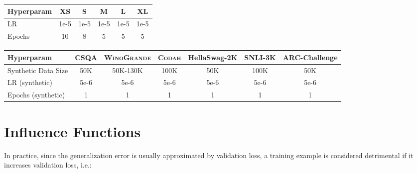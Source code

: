 \documentclass[11pt,a4paper]{article}
\newcommand{\gdaug}{}
\newcommand{\winogrande}{\textsc{WinoGrande}\xspace}
\newcommand{\codah}{\textsc{Codah}\xspace}
\newcommand{\roberta}{\textsc{RoBERTa}\xspace}
\begin{document}
\begin{table*}[t]
\begin{center}
\footnotesize
\begin{tabular}{lccccc}
\toprule
\bf Hyperparam  & \bf XS  & \bf S &\bf M &\bf L &\bf XL \\
\midrule 

LR &1e-5  &1e-5 &1e-5  &1e-5 &1e-5\\
Epochs & 10 & 8 &5 &5 &5\\


\bottomrule
\end{tabular}
\end{center}
\caption{
Hyperparameter settings for finetuning \roberta on \winogrande.
}
\label{app:original_hyperparams_wino}
\end{table*}



\begin{table*}[t]
\begin{center}
\footnotesize
\begin{tabular}{lcccccc}
\toprule
\bf Hyperparam  & \bf CSQA & \bf \winogrande  & \bf \codah &\bf HellaSwag-2K &\bf SNLI-3K &\bf ARC-Challenge \\
\midrule 
Synthetic Data Size &50K & 50K-130K\footnotemark &100K  &50K &100K &50K \\
LR (synthetic) &5e-6  &5e-6 &5e-6  &5e-6 &5e-6 &5e-6\\
Epochs (synthetic) & 1 & 1 &1 &1 &1 &1\\


\bottomrule
\end{tabular}
\end{center}
\caption{
Additional hyperparameter settings for \gdaug Two-Stage Training. For finetuning on the original data, we use the same settings as \roberta (except for CSQA and HellaSwag-2K, where we find reducing 2 epochs gives significantly better results).
For Winogrande, we generate 400K examples before the rejection procedure (see Appendix \ref{app:datasets}). The examples retained after the rejection procedure approximately ranges from 50K-130K depending on the training size.}
\label{app:gdaug_hyperparams}
\end{table*}


\section{Influence Functions}
\label{sec:influence_extra}

In practice, since the generalization error is usually approximated by validation loss, a training example  is considered detrimental if it increases validation loss, i.e.:
\end{document}
